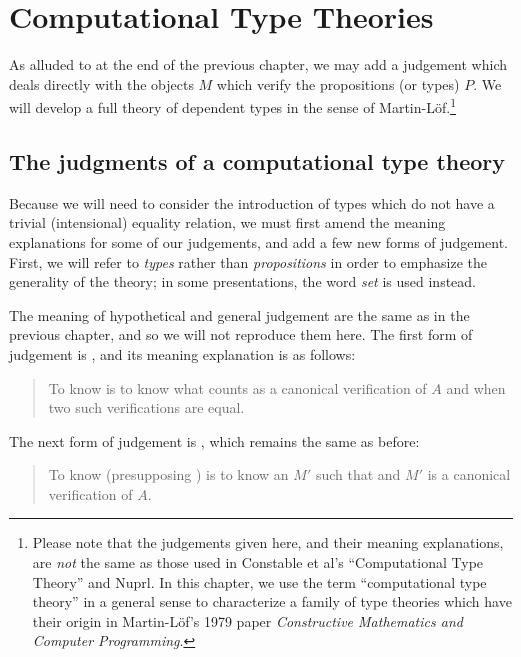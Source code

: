 \documentclass[main.tex]{subfiles}
\begin{document}
\onehalfspacing

\chapter{Computational Type Theories}

As alluded to at the end of the previous chapter, we may add a judgement
 which deals directly with the objects $M$ which verify the
propositions (or types) $P$. We will develop a full theory of dependent types
in the sense of Martin-L\"of.\footnote{Please note that the judgements given here, and
their meaning explanations, are \emph{not} the same as those used in Constable
et al's ``Computational Type Theory'' and Nuprl. In this chapter, we use the
term ``computational type theory'' in a general sense to characterize a family
of type theories which have their origin in Martin-L\"of's 1979 paper
\emph{Constructive Mathematics and Computer Programming}.}

\section{The judgments of a computational type theory}

Because we will need to consider the introduction of types which do not have a
trivial (intensional) equality relation, we must first amend the meaning
explanations for some of our judgements, and add a few new forms of judgement.
First, we will refer to \emph{types} rather than \emph{propositions} in order
to emphasize the generality of the theory; in some presentations, the word
\emph{set} is used instead.

The meaning of hypothetical and general judgement are the same as in the
previous chapter, and so we will not reproduce them here. The first form of
judgement is , and its meaning explanation is as follows:

\begin{quote}
  To know  is to know what counts as a canonical verification of $A$
  and when two such verifications are equal.
\end{quote}

The next form of judgement is , which remains the same as before:

\begin{quote}
  To know  (presupposing ) is to know an $M'$ such that
   and $M'$ is a canonical verification of $A$.
\end{quote}
\end{document}
